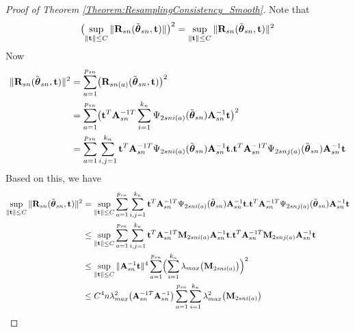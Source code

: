 \begin{proof}[Proof of Theorem \ref{Theorem:ResamplingConsistency_Smooth}]
Note that 
\begin{align} 
\bigl( \sup_{ \| {\bf{t}} \| \leq C} \| {\mathbf{R}}_{ s n} (\tilde{{\boldsymbol{\theta}}}_{s n },  {\bf{t}})\| \bigr)^{2}
= 
\sup_{ \| {\bf{t}} \| \leq C} \| {\mathbf{R}}_{ s n} (\tilde{{\boldsymbol{\theta}}}_{s n },  {\bf{t}})\|^{2}
\end{align}
%
Now
%
\begin{align} 
\| {\mathbf{R}}_{ s n} (\tilde{{\boldsymbol{\theta}}}_{s n },  {\bf{t}})\|^{2} & = 
\sum_{a = 1}^{ p_{s n}} 
\bigl( {\mathbf{R}}_{ s n (a)} (\tilde{{\boldsymbol{\theta}}}_{s n},  {\bf{t}}) \bigr)^{2} \notag\\
& = 
\sum_{a = 1}^{ p_{s n}} 
\bigl( 
{\bf{t}}^{T} {\mathbf{A}}_{ s n}^{-1T} 
\sum_{i =1}^{k_{n}} \Psi_{2 s n i (a)} (\tilde{{\boldsymbol{\theta}}}_{s n} ) {\mathbf{A}}_{ s n}^{-1} {\bf{t}}
\bigr)^{2} \notag\\
& = 
\sum_{a = 1}^{ p_{s n}} 
\sum_{i, j = 1}^{ k_{n}} 
{\bf{t}}^{T} {\mathbf{A}}_{ s n}^{-1T} \Psi_{2 s n i (a)} (\tilde{{\boldsymbol{\theta}}}_{s n} ) {\mathbf{A}}_{ s n}^{-1} {\bf{t}}.
{\bf{t}}^{T} {\mathbf{A}}_{ s n}^{-1T} \Psi_{2 s n j (a)} (\tilde{{\boldsymbol{\theta}}}_{s n} ) {\mathbf{A}}_{ s n}^{-1} {\bf{t}}
\end{align} 
%
Based on this, we have
%
\begin{align} 
\sup_{ \| {\bf{t}} \| \leq C} \| {\mathbf{R}}_{ s n} (\tilde{{\boldsymbol{\theta}}}_{s n },  {\bf{t}})\|^{2} & = \sup_{ \| {\bf{t}} \| \leq C} 
\sum_{a = 1}^{ p_{s n}} 
\sum_{i, j = 1}^{ k_{n}} 
{\bf{t}}^{T} {\mathbf{A}}_{ s n}^{-1T} \Psi_{2 s n i (a)} (\tilde{{\boldsymbol{\theta}}}_{s n} ) {\mathbf{A}}_{ s n}^{-1} {\bf{t}}.
{\bf{t}}^{T} {\mathbf{A}}_{ s n}^{-1T} \Psi_{2 s n j (a)} (\tilde{{\boldsymbol{\theta}}}_{s n} ) {\mathbf{A}}_{ s n}^{-1} {\bf{t}}
\notag\\
& \leq \sup_{ \| {\bf{t}} \| \leq C} 
\sum_{a = 1}^{ p_{s n}} 
\sum_{i, j = 1}^{ k_{n}} 
{\bf{t}}^{T} {\mathbf{A}}_{ s n}^{-1T} {\mathbf{M}}_{2 s n i (a)}  {\mathbf{A}}_{ s n}^{-1} {\bf{t}}.
{\bf{t}}^{T} {\mathbf{A}}_{ s n}^{-1T} {\mathbf{M}}_{2 s n j (a)}  {\mathbf{A}}_{ s n}^{-1} {\bf{t}}
\notag\\
& \leq \sup_{ \| {\bf{t}} \| \leq C} \| {\mathbf{A}}_{ s n}^{-1} {\bf{t}} \|^{4}
\sum_{a = 1}^{ p_{s n}} 
\Bigl(
\sum_{i = 1}^{ k_{n}} 
 \lambda_{max} \bigl( {\mathbf{M}}_{2 s n i (a)} \bigr) \Bigr)^{2}
\notag \\
& \leq  C^{4} n \lambda_{max}^{2} \bigl( {\mathbf{A}}_{ s n}^{-1T} {\mathbf{A}}_{ s n}^{-1} \bigr)
\sum_{a = 1}^{ p_{s n}} 
\sum_{i = 1}^{ k_{n}} 
 \lambda_{max}^{2} \bigl( {\mathbf{M}}_{2 s n i (a)} \bigr)
 \end{align} 


\end{proof}
